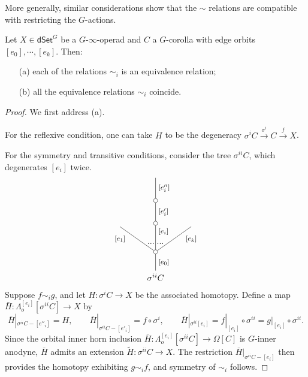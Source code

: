 \documentclass[a4paper,10pt
,draft
]{article}%
\renewcommand{\1}{\ensuremath{\mathbb{id}}}
\begin{document}
\begin{example}
More generally, similar considerations show that the $\sim$ relations are compatible with restricting the $G$-actions.
\end{example}


\begin{lemma}\label{EQUIVI LEM}
	Let $X \in \mathsf{dSet}^G$ be a $G$-$\infty$-operad and $C$ a $G$-corolla with edge orbits
	$[e_0],\cdots,[e_k]$. Then:
\begin{itemize}
	\item[(a)] each of the relations $\sim_i$ is an equivalence relation;
	\item[(b)] all the equivalence relations $\sim_i$ coincide.
\end{itemize}
\end{lemma}

\begin{proof}
	We first address (a). 
	
	For the reflexive condition, one can take $H$ to be the degeneracy
	$\sigma^i C \xrightarrow{\sigma^i} C \xrightarrow{f} X$.
	
	For the symmetry and transitive conditions, consider the tree
	$\sigma^{ii} C$, which degenerates $[e_i]$ twice.
\[
\begin{tikzpicture}
[grow=up,auto,level distance=3em,
every node/.style = {font=\footnotesize},
dummy/.style={circle,draw,inner sep=0pt,minimum size=1.75mm}]
	\node at (0,0) [font=\normalsize]{$\sigma^{ii} C$}
		child{node [dummy] {}
			child{
			edge from parent node [swap,near end] {$[e_k]$} node [near start,inner sep=1pt,name=Kn] {}}
			child[level distance=3.4em]{node [dummy] {}
				child[level distance=2.7em]{node [dummy] {}
					child[level distance=2.7em]{
					edge from parent node [swap] {$[e''_i]$}
}
				edge from parent node [swap] {$[e'_i]$}
}
			edge from parent node [near end,swap] {$[e_i]$}
node [near start,inner sep=1pt,name=Kone,swap] {}
node [near start,inner sep=1pt,name=Kone1] {}}
			child{
			edge from parent node [near end] {$[e_1]$}
node [swap] {}
node [near start,inner sep=1pt,name=Kn1,swap]{}}
		edge from parent node [swap] {$[e_0]$}
		};
		\draw [dotted,thick] (Kone) -- (Kn) ;
		\draw [dotted,thick] (Kone1) -- (Kn1) ;
\end{tikzpicture}
\]
Suppose $f \sim_i g$, and let 
$H \colon \sigma^{i} C \to X$ be the associated homotopy.
Define a map 
$\bar{H} \colon \Lambda^{[e_i]}_o[\sigma^{ii} C] \to X$ by
\[
	\bar{H}|_{\sigma^{ii}C - [e''_i]} = H,
		\qquad
	\bar{H}|_{\sigma^{ii}C - [e'_i]} = f \circ \sigma^i,
		\qquad
	\bar{H}|_{\sigma^{ii} [e_i]} = 
	f|_{[e_i]} \circ \sigma^{ii} =
	g|_{[e_i]} \circ \sigma^{ii}.
\]
Since the orbital inner horn inclusion
$\bar{H} \colon \Lambda^{[e_i]}_o[\sigma^{ii} C] \to \Omega[C]$
is $G$-inner anodyne,
$\bar{H}$ admits an extension $\widetilde{H} \colon \sigma^{ii}C \to X$.
The restriction $\bar{H}|_{\sigma^{ii}C - [e_i]}$ then provides the homotopy exhibiting $g \sim_i f$, and symmetry of $\sim_i$ follows.


\end{proof}
\end{document}
